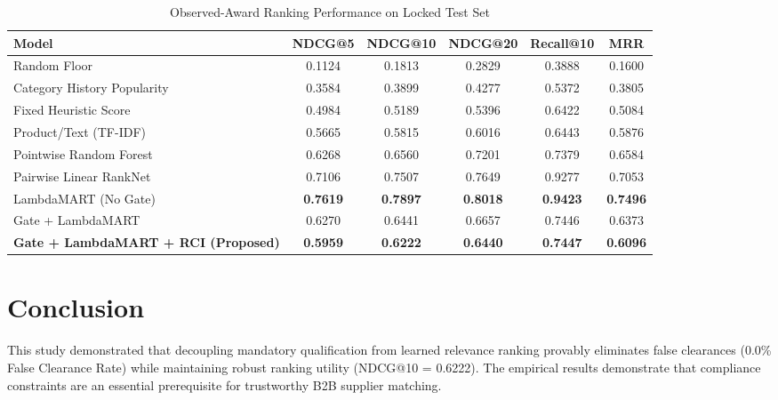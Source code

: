 \documentclass[journal,10pt,onecolumn,draftclsnofoot]{IEEEtran}
\begin{document}
\begin{table}[h]
\centering
\caption{Observed-Award Ranking Performance on Locked Test Set}
\label{tab:results}
\begin{tabular}{lccccc}
\toprule
Model & NDCG@5 & NDCG@10 & NDCG@20 & Recall@10 & MRR \\
\midrule
Random Floor & 0.1124 & 0.1813 & 0.2829 & 0.3888 & 0.1600 \\
Category History Popularity & 0.3584 & 0.3899 & 0.4277 & 0.5372 & 0.3805 \\
Fixed Heuristic Score & 0.4984 & 0.5189 & 0.5396 & 0.6422 & 0.5084 \\
Product/Text (TF-IDF) & 0.5665 & 0.5815 & 0.6016 & 0.6443 & 0.5876 \\
Pointwise Random Forest & 0.6268 & 0.6560 & 0.7201 & 0.7379 & 0.6584 \\
Pairwise Linear RankNet & 0.7106 & 0.7507 & 0.7649 & 0.9277 & 0.7053 \\
LambdaMART (No Gate) & \textbf{0.7619} & \textbf{0.7897} & \textbf{0.8018} & \textbf{0.9423} & \textbf{0.7496} \\
Gate + LambdaMART & 0.6270 & 0.6441 & 0.6657 & 0.7446 & 0.6373 \\
\textbf{Gate + LambdaMART + RCI (Proposed)} & \textbf{0.5959} & \textbf{0.6222} & \textbf{0.6440} & \textbf{0.7447} & \textbf{0.6096} \\
\bottomrule
\end{tabular}
\end{table}

\section{Conclusion}
This study demonstrated that decoupling mandatory qualification from learned relevance ranking provably eliminates false clearances (0.0\% False Clearance Rate) while maintaining robust ranking utility (NDCG@10 = 0.6222). The empirical results demonstrate that compliance constraints are an essential prerequisite for trustworthy B2B supplier matching.



\end{document}
